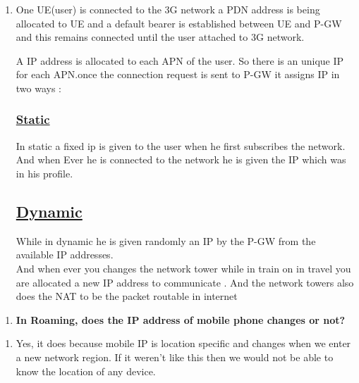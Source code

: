 \documentclass{article}
\begin{document}
\begin{enumerate}[label=\textbf{Solution.}]
\item
One UE(user) is connected to the 3G network  a PDN address is being allocated to UE and a default bearer is established between UE and P-GW and this remains connected until the user attached to 3G network.

A  IP address is allocated to each APN of the user. So there is an unique IP for each APN.once the connection request is sent to P-GW it assigns IP in two ways :
\subsubsection{\large \underline{Static}}
In static a fixed ip is given to the user when he first subscribes the network. And when 
Ever he is connected to the network he is given the IP which was in his profile.
\subsection{\large \underline{Dynamic}}
While in dynamic he is given randomly an IP by the P-GW from  the available IP addresses.\\

And when ever you changes the network tower while in train on in travel you are allocated a new IP address to communicate .
And the network towers also does the NAT to be the packet routable in internet
\end{enumerate}
\vspace{0.02\textheight}
\begin{enumerate}[label=\textbf{Question \arabic*.},resume]
\item \textbf{In Roaming, does the IP address of mobile phone changes or not?}
\end{enumerate}
\begin{enumerate}[label=\textbf{Solution.}]
\item Yes, it does because mobile IP is location specific and changes when we enter a new network region.
If it weren't like this then we would not be able to know the location of any device.
\end{enumerate}
 
\end{document}
